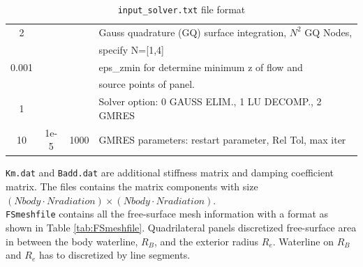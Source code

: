 \documentclass[12pt,a4paper,titlepage]{article}
\begin{document}
\begin{table}[ht]
\begin{center}
\caption{\texttt{input\_solver.txt} file format}\label{tab:input_solver}
\begin{tabular}{cccl}
\hline
2&\ &\ & Gauss quadrature (GQ) surface integration, $N^2$ GQ Nodes,\\
\ &\ &\ &  specify N=[1,4] \\
\hline
0.001 &\ &\ &  eps\_zmin for determine minimum z of flow and \\
\ &\ &\ & source points of panel.\\
\hline
1 &\ &\  & Solver option: 0 GAUSS ELIM., 1 LU DECOMP., 2 GMRES \\
\hline
10 & 1e-5& 1000 & GMRES parameters: restart parameter, Rel Tol, max iter\\
\hline
\end{tabular}
\end{center}
\end{table}

\noindent
\texttt{Km.dat} and \texttt{Badd.dat} are additional stiffness matrix and damping coefficient matrix. The files contains the matrix components with size $(Nbody\cdot Nradiation)\times (Nbody\cdot Nradiation)$.\\

\noindent
\texttt{FSmeshfile} contains all the free-surface mesh information  with a format as shown in Table \ref{tab:FSmeshfile}. Quadrilateral panels discretized free-surface area in between the body waterline, $R_B$, and the exterior radius $R_e$. Waterline on $R_B$ and $R_e$ has to discretized by line segments.
\end{document}
